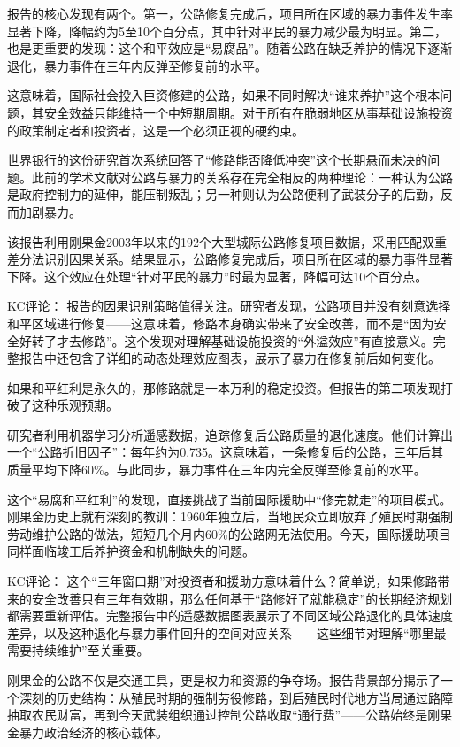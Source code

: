 \documentclass[11pt]{ctexart}
\begin{document}
报告的核心发现有两个。第一，公路修复完成后，项目所在区域的暴力事件发生率显著下降，降幅约为5至10个百分点，其中针对平民的暴力减少最为明显。第二，也是更重要的发现：这个和平效应是“易腐品”。随着公路在缺乏养护的情况下逐渐退化，暴力事件在三年内反弹至修复前的水平。

这意味着，国际社会投入巨资修建的公路，如果不同时解决“谁来养护”这个根本问题，其安全效益只能维持一个中短期周期。对于所有在脆弱地区从事基础设施投资的政策制定者和投资者，这是一个必须正视的硬约束。

世界银行的这份研究首次系统回答了“修路能否降低冲突”这个长期悬而未决的问题。此前的学术文献对公路与暴力的关系存在完全相反的两种理论：一种认为公路是政府控制力的延伸，能压制叛乱；另一种则认为公路便利了武装分子的后勤，反而加剧暴力。

该报告利用刚果金2003年以来的192个大型城际公路修复项目数据，采用匹配双重差分法识别因果关系。结果显示，公路修复完成后，项目所在区域的暴力事件显著下降。这个效应在处理“针对平民的暴力”时最为显著，降幅可达10个百分点。

KC评论： 报告的因果识别策略值得关注。研究者发现，公路项目并没有刻意选择和平区域进行修复——这意味着，修路本身确实带来了安全改善，而不是“因为安全好转了才去修路”。这个发现对理解基础设施投资的“外溢效应”有直接意义。完整报告中还包含了详细的动态处理效应图表，展示了暴力在修复前后如何变化。

如果和平红利是永久的，那修路就是一本万利的稳定投资。但报告的第二项发现打破了这种乐观预期。

研究者利用机器学习分析遥感数据，追踪修复后公路质量的退化速度。他们计算出一个“公路折旧因子”：每年约为0.735。这意味着，一条修复后的公路，三年后其质量平均下降60\%。与此同步，暴力事件在三年内完全反弹至修复前的水平。

这个“易腐和平红利”的发现，直接挑战了当前国际援助中“修完就走”的项目模式。刚果金历史上就有深刻的教训：1960年独立后，当地民众立即放弃了殖民时期强制劳动维护公路的做法，短短几个月内60\%的公路网无法使用。今天，国际援助项目同样面临竣工后养护资金和机制缺失的问题。

KC评论： 这个“三年窗口期”对投资者和援助方意味着什么？简单说，如果修路带来的安全改善只有三年有效期，那么任何基于“路修好了就能稳定”的长期经济规划都需要重新评估。完整报告中的遥感数据图表展示了不同区域公路退化的具体速度差异，以及这种退化与暴力事件回升的空间对应关系——这些细节对理解“哪里最需要持续维护”至关重要。

刚果金的公路不仅是交通工具，更是权力和资源的争夺场。报告背景部分揭示了一个深刻的历史结构：从殖民时期的强制劳役修路，到后殖民时代地方当局通过路障抽取农民财富，再到今天武装组织通过控制公路收取“通行费”——公路始终是刚果金暴力政治经济的核心载体。
\end{document}
